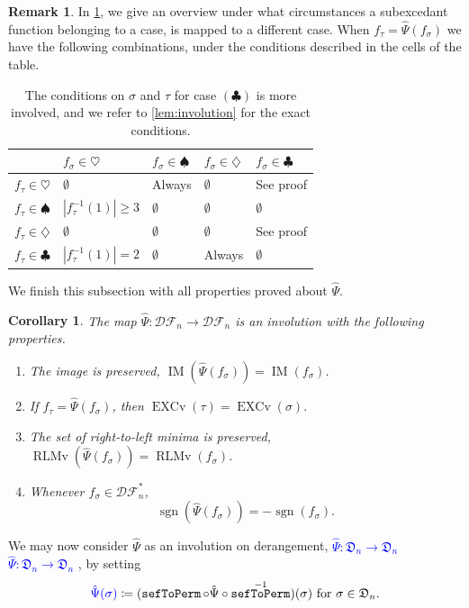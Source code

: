 \documentclass[reqno]{amsart}
\newtheorem{corollary}[theorem]{Corollary}
\theoremstyle{definition}
\newtheorem{remark}[theorem]{Remark}
\newcommand{\defin}[1]{%
\relax\ifmmode%
\textcolor{blue}{#1}%
\else\textcolor{blue}{\emph{#1}}%
\fi%
}
\newcommand{\dArr}{\mathfrak{D}}
\newcommand{\DSEF}{\mathcal{DF}}%
\newcommand{\fretherD}{\hat{\Psi}}
\newcommand{\caseOne}{\ensuremath{\heartsuit}}
\newcommand{\caseTwo}{\ensuremath{\spadesuit}}
\newcommand{\caseThree}{\ensuremath{\diamondsuit}}
\newcommand{\caseFour}{\ensuremath{\clubsuit}}
\DeclareMathOperator{\sgn}{sgn}
\DeclareMathOperator{\EXCv}{EXCv}
\DeclareMathOperator{\RLMv}{RLMv}
\DeclareMathOperator{\supp}{IM}
\DeclareMathOperator{\sefToPerm}{\mathtt{sefToPerm}}
\begin{document}
\begin{remark}
In \cref{tab:casesCombinations}, we give an overview under what circumstances 
a subexcedant function belonging to a case, is mapped to a different case.
When $f_\tau = \fretherD(f_\sigma)$ we have the following combinations, under the 
conditions described in the cells of the table.
%
\begin{table}[!ht]
\begin{center}
\begin{tabular}{lp{2cm}p{2cm}p{2cm}p{2cm}}
 \; & $f_\sigma\in\caseOne$ & $f_\sigma\in\caseTwo$ & $f_\sigma\in\caseThree$ & $f_\sigma\in\caseFour$ \\
   \toprule 
$f_\tau\in\caseOne$   & $\emptyset$  & Always & $\emptyset$ & See proof \\
$f_\tau\in\caseTwo$   & $|f_\tau^{-1}(1)|\geq 3$  & $\emptyset$ & $\emptyset$ & $\emptyset$\\
$f_\tau\in\caseThree$ & $\emptyset$  & $\emptyset$ & $\emptyset$ & See proof\\
$f_\tau\in\caseFour$  & $|f_\tau^{-1}(1)| =2$  & $\emptyset$ & Always & $\emptyset$
\end{tabular}
\caption{
The conditions on $\sigma$ and $\tau$ for case $(\caseFour)$
is more involved, and we refer to \cref{lem:involution} for the exact conditions.
}\label{tab:casesCombinations}
\end{center}
\end{table}
\end{remark}


We finish this subsection with all properties proved about $\fretherD$.
\begin{corollary}\label{cor:fretherDProps}
The map $\fretherD:\DSEF_n\longrightarrow \DSEF_n$
is an involution with the following properties.
%
\begin{enumerate}[label=(\roman*)]
\item 
	The image is preserved, $\supp(\fretherD(f_\sigma )) = \supp( f_\sigma )$.
\item 
	If $f_\tau = \fretherD(f_{\sigma})$, then 
	$
		\EXCv(\tau) = \EXCv(\sigma).
	$
\item 
	The set of right-to-left minima is preserved,
	$\RLMv( \fretherD(f_\sigma ) ) = \RLMv( f_\sigma )$.
\item 
	Whenever $f_\sigma \in \DSEF^*_n$, 
	\[
	\sgn(\fretherD(f_\sigma )) = -\sgn( f_\sigma ).
	\]
\end{enumerate} 
\end{corollary}
We may now consider $\fretherD$ as an involution on derangement, \defin{$\fretherD:\dArr_n \to \dArr_n$},
by setting
\[
  \defin{\fretherD(\sigma)} \coloneqq (\sefToPerm \circ \fretherD \circ \sefToPerm^{-1})(\sigma)
  \text{ for $\sigma \in \dArr_n$.}
\]
\end{document}

